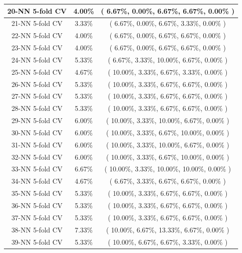 \documentclass[11pt,a4paper]{article}
\begin{document}
\begin{center}
\begin{tabular} {|| c | c | c ||}
        20-NN 5-fold CV & 4.00\% & ( 6.67\%, 0.00\%, 6.67\%, 6.67\%, 0.00\% )\\ \hline
        21-NN 5-fold CV & 3.33\% & ( 6.67\%, 0.00\%, 6.67\%, 3.33\%, 0.00\% )\\ \hline
        22-NN 5-fold CV & 4.00\% & ( 6.67\%, 0.00\%, 6.67\%, 6.67\%, 0.00\% )\\ \hline
        23-NN 5-fold CV & 4.00\% & ( 6.67\%, 0.00\%, 6.67\%, 6.67\%, 0.00\% )\\ \hline
        24-NN 5-fold CV & 5.33\% & ( 6.67\%, 3.33\%, 10.00\%, 6.67\%, 0.00\% )\\ \hline
        25-NN 5-fold CV & 4.67\% & ( 10.00\%, 3.33\%, 6.67\%, 3.33\%, 0.00\% )\\ \hline
        26-NN 5-fold CV & 5.33\% & ( 10.00\%, 3.33\%, 6.67\%, 6.67\%, 0.00\% )\\ \hline
        27-NN 5-fold CV & 5.33\% & ( 10.00\%, 3.33\%, 6.67\%, 6.67\%, 0.00\% )\\ \hline
        28-NN 5-fold CV & 5.33\% & ( 10.00\%, 3.33\%, 6.67\%, 6.67\%, 0.00\% )\\ \hline
        29-NN 5-fold CV & 6.00\% & ( 10.00\%, 3.33\%, 10.00\%, 6.67\%, 0.00\% )\\ \hline
        30-NN 5-fold CV & 6.00\% & ( 10.00\%, 3.33\%, 6.67\%, 10.00\%, 0.00\% )\\ \hline
        31-NN 5-fold CV & 6.00\% & ( 10.00\%, 3.33\%, 10.00\%, 6.67\%, 0.00\% )\\ \hline
        32-NN 5-fold CV & 6.00\% & ( 10.00\%, 3.33\%, 6.67\%, 10.00\%, 0.00\% )\\ \hline
        33-NN 5-fold CV & 6.67\% & ( 10.00\%, 3.33\%, 10.00\%, 10.00\%, 0.00\% )\\ \hline
        34-NN 5-fold CV & 4.67\% & ( 6.67\%, 3.33\%, 6.67\%, 6.67\%, 0.00\% )\\ \hline
        35-NN 5-fold CV & 5.33\% & ( 10.00\%, 3.33\%, 6.67\%, 6.67\%, 0.00\% )\\ \hline
        36-NN 5-fold CV & 5.33\% & ( 10.00\%, 3.33\%, 6.67\%, 6.67\%, 0.00\% )\\ \hline
        37-NN 5-fold CV & 5.33\% & ( 10.00\%, 3.33\%, 6.67\%, 6.67\%, 0.00\% )\\ \hline
        38-NN 5-fold CV & 7.33\% & ( 10.00\%, 6.67\%, 13.33\%, 6.67\%, 0.00\% )\\ \hline
39-NN 5-fold CV & 5.33\% & ( 10.00\%, 6.67\%, 6.67\%, 3.33\%, 0.00\% )\\ \hline
    \end{tabular}
\end{center}
\newpage
\end{document}
